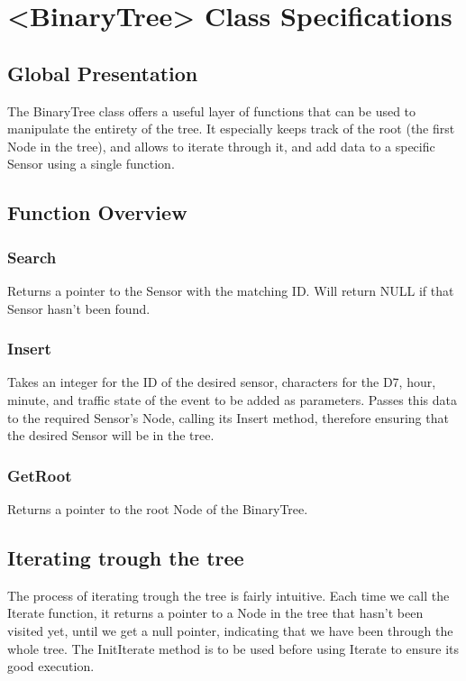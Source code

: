 \documentclass[10pt]{article}
\begin{document}
\section{<BinaryTree> Class Specifications}
\subsection{Global Presentation}
The BinaryTree class offers a useful layer of functions that can be used to manipulate the entirety of the tree. It especially keeps track of the root (the first Node in the tree), and allows to iterate through it, and add data to a specific Sensor using a single function.

\subsection{Function Overview}
\subsubsection*{Search}
Returns a pointer to the Sensor with the matching ID. Will return NULL if that Sensor hasn't been found.

\subsubsection*{Insert}
Takes an integer for the ID of the desired sensor, characters for the D7, hour, minute, and traffic state of the event to be added as parameters. Passes this data to the required Sensor's Node, calling its Insert method, therefore ensuring that the desired Sensor will be in the tree.

\subsubsection*{GetRoot}
Returns a pointer to the root Node of the BinaryTree.

\subsection{Iterating trough the tree}
The process of iterating trough the tree is fairly intuitive. Each time we call the Iterate function, it returns a pointer to a Node in the tree that hasn't been visited yet, until we get a null pointer, indicating that we have been through the whole tree. The InitIterate method is to be used before using Iterate to ensure its good execution.
\end{document}

